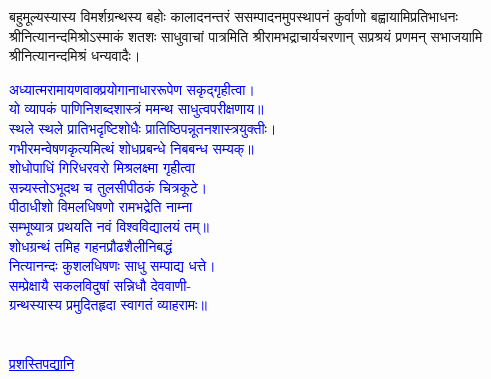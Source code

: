 \begin{sloppypar}\justifying\noindent\hspace{10mm} बहुमूल्यस्यास्य विमर्श\-ग्रन्थस्य बहोः कालादनन्तरं ससम्पादनमुपस्थापनं कुर्वाणो बह्वायामि\-प्रतिभा\-धनः श्रीनित्यानन्द\-मिश्रोऽस्माकं शतशः साधुवाचां पात्रमिति श्रीरामभद्राचार्य\-चरणान् सप्रश्रयं प्रणमन् सभाजयामि श्रीनित्यानन्द\-मिश्रं धन्यवादैः।\end{sloppypar}
\fontsize{14}{21}\selectfont\centering\textcolor{blue}{अध्यात्मरामायणवाक्प्रयोगानाधाररूपेण सकृद्गृहीत्वा।\nopagebreak\\
यो व्यापकं पाणिनिशब्दशास्त्रं ममन्थ साधुत्वपरीक्षणाय॥\\
स्थले स्थले प्रातिभदृष्टिशोधैः प्रातिष्ठिपन्नूतनशास्त्रयुक्तीः।\nopagebreak\\
गभीरमन्वेषणकृत्यमित्थं शोधप्रबन्धे निबबन्ध सम्यक्॥\\
शोधोपाधिं गिरिधरवरो मिश्रलक्ष्मा गृहीत्वा\nopagebreak\\
सन्न्यस्तोऽभूदथ च तुलसीपीठकं चित्रकूटे।\\
पीठाधीशो विमलधिषणो रामभद्रेति नाम्ना\nopagebreak\\
सम्भूष्यात्र प्रथयति नवं विश्वविद्यालयं तम्॥\\
शोधग्रन्थं तमिह गहनप्रौढशैलीनिबद्धं\nopagebreak\\
नित्यानन्दः कुशलधिषणः साधु सम्पाद्य धत्ते।\\
सम्प्रेक्षायै सकलविदुषां सन्निधौ देववाणी-\nopagebreak\\
ग्रन्थस्यास्य प्रमुदितहृदा स्वागतं व्याहरामः॥}\\
\vspace{4mm}
\fontsize{14}{19}\selectfont
{}\nopagebreak\\
\fontsize{12}{16}\selectfont
{}\\
\vspace{8mm}
\fontsize{18}{27}\selectfont
\centering\textcolor{blue}{\underline{प्रशस्तिपद्यानि}}\nopagebreak\\
